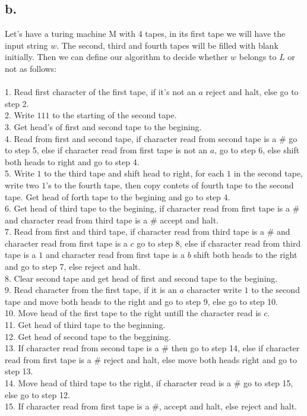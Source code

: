 \documentclass[12pt]{article}
\begin{document}
\subsection*{b.}
Let's have a turing machine M with 4 tapes, in its first tape we will
have the input string $w$. The second, third and fourth tapes will be filled
with blank initially. Then we can define our algorithm to decide whether
$w$ belongs to $L$ or not as follows:\\
\\
1. Read first character of the first tape, if it's not an $a$ reject
and halt, else go to step 2.\\
2. Write $111$ to the starting of the second tape.\\
3. Get head's of first and second tape to the begining.\\
4. Read from first and second tape, if character read from second tape is a $\#$
go to step 5, else if character read from first tape
is not an $a$, go to step 6, else shift both heads to right and go to step 4.\\
5. Write $1$ to the third tape and shift head to right, for each $1$ in the
second tape, write two $1$'s to the fourth tape, then copy contets of fourth
tape to the second tape. Get head of forth tape to the begining and go to step 4.\\
6. Get head of third tape to the begining, if character read from first tape is 
a $\#$ and character read from third tape is a $\#$ accept and halt.\\
7. Read from first and third tape, if character read from third tape is a $\#$
and character read from first tape is a $c$ go to step 8, else if character
read from third tape is a $1$ and character read from first tape is a $b$
shift both heads to the right and go to step 7, else reject and halt.\\
8. Clear second tape and get head of first and second tape to the begining.\\
9. Read character from the first tape, if it is an $a$ character write $1$ to the
second tape and move both heads to the right and go to step 9, else go to step 10.\\
10. Move head of the first tape to the right untill the character read is $c$.\\
11. Get head of third tape to the beginning.\\
12. Get head of second tape to the beggining.\\
13. If character read from second tape is a $\#$ then go to step 14, else if
character read from first tape is a $\#$ reject and halt, else move both heads
right and go to step 13.\\
14. Move head of third tape to the right, if character read is a $\#$ go to step 15,
else go to step 12.\\
15. If character read from first tape is a $\#$, accept and halt, else reject and halt.\\
\end{document}
